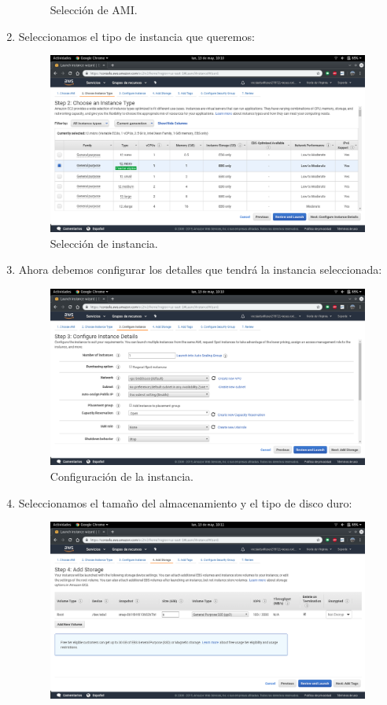 \begin{enumerate}
\begin{figure}[h]
		\caption{Selección de AMI.}
		\label{Selección de AMI}
	\end{figure}
	\item Seleccionamos el tipo de instancia que queremos:
	\begin{figure}[h]
		\centering
		\includegraphics[scale=0.28]{ImagenesAWS/MV/6.png}
		\caption{Selección de instancia.}
		\label{Selección de instancia}
	\end{figure}
\newpage
	\item Ahora debemos configurar los detalles que tendrá la instancia seleccionada:
	\begin{figure}[h]
		\centering
		\includegraphics[scale=0.28]{ImagenesAWS/MV/7.png}
		\caption{Configuración de la instancia.}
		\label{Configuración de la instancia}
	\end{figure}
	\item Seleccionamos el tamaño del almacenamiento y el tipo de disco duro:
	\begin{figure}[h]
		\centering
		\includegraphics[scale=0.28]{ImagenesAWS/MV/8.png}

\end{figure}
\end{enumerate}
